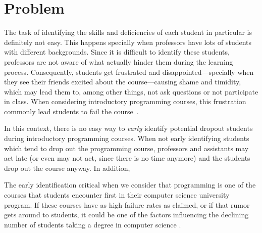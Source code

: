 \section{Problem}

\label{sec:problem}

The task of identifying the skills and deficiencies of each student in particular is definitely not easy. This happens specially when professors have lots of students with different backgrounds.
Since it is difficult to identify these students, professors are not aware of what actually hinder them during the learning process. Consequently, students get frustrated and disappointed---specially when they see their friends excited about the course---causing shame and timidity, which may lead them to, among other things, not ask questions or not participate in class. When considering introductory programming courses, this frustration commonly lead students to fail the course~\cite{}.


In this context, there is no easy way to \textit{early} identify potential dropout students during introductory programming courses. When not early identifying students which tend to drop out the programming course, professors and assistants may act late (or even may not act, since there is no time anymore) and the students drop out the course anyway. In addition, 


The early identification critical when we consider that programming is one of the courses that students encounter first in their computer science university program. If these courses have as high failure rates as claimed, or if that rumor gets around to students, it could be one of the factors influencing the declining number of students taking a degree in computer science \cite{bennedsen-sigcse}. 